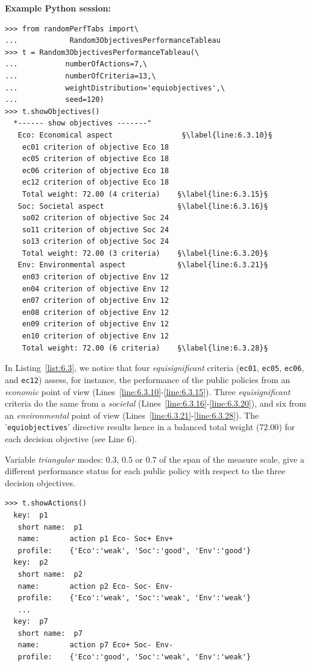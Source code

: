 \noindent \textbf{Example Python session:}
\begin{lstlisting}[caption={Generating a random 3 Objectives performance tableau},label=list:6.3]
>>> from randomPerfTabs import\
...            Random3ObjectivesPerformanceTableau
>>> t = Random3ObjectivesPerformanceTableau(\
...           numberOfActions=7,\
...           numberOfCriteria=13,\
...           weightDistribution='equiobjectives',\
...           seed=120)
>>> t.showObjectives()
  *------ show objectives -------"
   Eco: Economical aspect                §\label{line:6.3.10}§
    ec01 criterion of objective Eco 18
    ec05 criterion of objective Eco 18
    ec06 criterion of objective Eco 18
    ec12 criterion of objective Eco 18  
    Total weight: 72.00 (4 criteria)    §\label{line:6.3.15}§
   Soc: Societal aspect                 §\label{line:6.3.16}§
    so02 criterion of objective Soc 24
    so11 criterion of objective Soc 24
    so13 criterion of objective Soc 24
    Total weight: 72.00 (3 criteria)    §\label{line:6.3.20}§
   Env: Environmental aspect            §\label{line:6.3.21}§
    en03 criterion of objective Env 12
    en04 criterion of objective Env 12
    en07 criterion of objective Env 12
    en08 criterion of objective Env 12
    en09 criterion of objective Env 12
    en10 criterion of objective Env 12
    Total weight: 72.00 (6 criteria)    §\label{line:6.3.28}§
\end{lstlisting}

In Listing~\vref{list:6.3}, we notice that four \emph{equisignificant} criteria (\texttt{ec01}, \texttt{ec05}, \texttt{ec06}, and \texttt{ec12}) assess, for instance, the performance of the public policies from an \emph{economic} point of view (Lines~\ref{line:6.3.10}-\ref{line:6.3.15}). Three \emph{equisignificant} criteria do the same from a \emph{societal} (Lines~\ref{line:6.3.16}-\ref{line:6.3.20}), and six from an \emph{environmental} point of view (Lines~\ref{line:6.3.21}-\ref{line:6.3.28}). The '\texttt{equiobjectives}' directive results hence in a balanced total weight ($72.00$) for each decision objective (see Line 6). 

Variable \emph{triangular} modes: $0.3$, $0.5$ or $0.7$ of the span of the measure scale, give a different performance status for each public policy with respect to the three decision objectives.
\begin{lstlisting}
>>> t.showActions()
  key:  p1
   short name:  p1
   name:       action p1 Eco- Soc+ Env+
   profile:    {'Eco':'weak', 'Soc':'good', 'Env':'good'}
  key:  p2
   short name:  p2
   name:       action p2 Eco- Soc- Env-
   profile:    {'Eco':'weak', 'Soc':'weak', 'Env':'weak'}
   ...
  key:  p7
   short name:  p7
   name:       action p7 Eco+ Soc- Env-
   profile:    {'Eco':'good', 'Soc':'weak', 'Env':'weak'}
\end{lstlisting}

